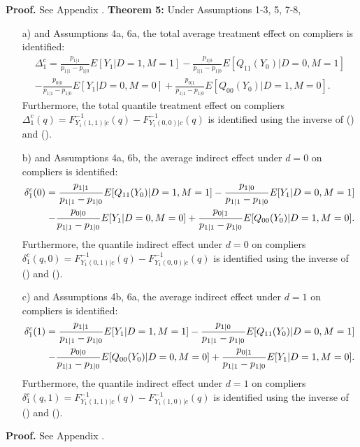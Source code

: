 \documentclass[a4paper,12pt]{article}
\begin{document}
\textbf{Proof.} See Appendix .
\noindent \textbf{Theorem 5:} Under Assumptions 1-3, 5, 7-8,
\begin{itemize}
\item[a)] and Assumptions 4a, 6a, the total average treatment effect on compliers is identified:
\begin{align*}
\Delta_1^c= \frac{p_{1|1}}{ p_{1|1} - p_{1|0}} E[Y_1|D=1,M=1] -\frac{p_{1|0}}{p_{1|1} - p_{1|0}}E[Q_{11}(Y_0)|D=0,M=1] \\
 − \frac{p_{0|0}}{ p_{1|1} - p_{1|0}} E[Y_1|D=0,M=0] +\frac{p_{0|1}}{p_{1|1} - p_{1|0}}E[Q_{00}(Y_0)|D=1,M=0].
\end{align*}
Furthermore, the total quantile treatment effect on compliers $\Delta_1^{c}(q) = F_{Y_{1}(1,1)|c}^{-1}(q)-F_{Y_{1}(0,0)|c}^{-1}(q)$ is identified using the inverse of () and ().
\item[b)] and Assumptions 4a, 6b, the average indirect effect
under $d = 0$ on compliers is identified:
\begin{align*}
\delta_1^c(0) = \frac{p_{1|1}}{p_{1|1}-p_{1|0}}E[Q_{11}(Y_0)|D=1,M=1] - \frac{p_{1|0}}{p_{1|1}-p_{1|0}}E[Y_1|D=0,M=1]\\
\hspace{-0.15cm}- \frac{p_{0|0}}{p_{1|1} - p_{1|0}} E[Y_1|D=0,M=0] +\frac{p_{0|1}}{p_{1|1} - p_{1|0}}E[Q_{00}(Y_0)|D=1,M=0].
\end{align*}
Furthermore, the quantile indirect effect
under $d = 0$ on compliers $\delta_1^{c}(q,0) = F_{Y_{1}(0,1)|c}^{-1}(q)-F_{Y_{1}(0,0)|c}^{-1}(q)$ is identified using the inverse of () and ().
\item[c)] and Assumptions 4b, 6a, the average indirect effect
under $d = 1$ on compliers is identified:
\begin{align*}
\delta_1^{c}(1) = \frac{p_{1|1}}{ p_{1|1} - p_{1|0}} E[Y_1|D=1,M=1] -\frac{p_{1|0}}{p_{1|1} - p_{1|0}}E[Q_{11}(Y_0)|D=0,M=1]\\
\hspace{-0.15cm}- \frac{p_{0|0}}{p_{1|1} - p_{1|0}}E[Q_{00}(Y_0)|D=0,M=0] + \frac{p_{0|1}}{p_{1|1} - p_{1|0}}E[Y_1|D=1,M=0].
\end{align*}
Furthermore, the quantile indirect effect
under $d = 1$ on compliers $\delta_1^{c}(q,1) = F_{Y_{1}(1,1)|c}^{-1}(q)-F_{Y_{1}(1,0)|c}^{-1}(q)$ is identified using the inverse of () and ().
\end{itemize}
\textbf{Proof.} See Appendix .
\end{document}
